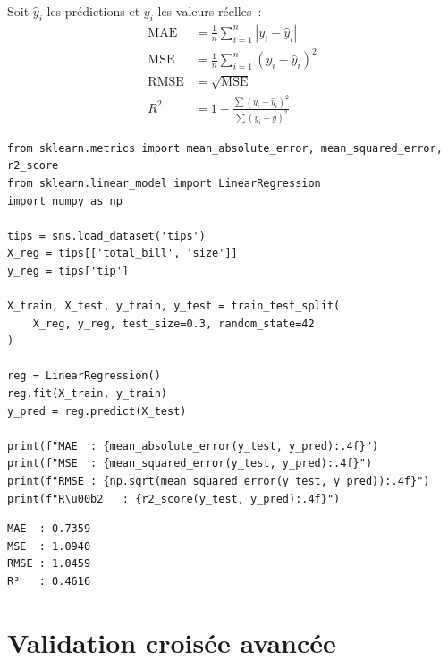 
\begin{definition}
Soit $\hat{y}_i$ les pr\'edictions et $y_i$ les valeurs r\'eelles~:
\begin{align}
\text{MAE} &= \frac{1}{n}\sum_{i=1}^{n}|y_i - \hat{y}_i| \\[6pt]
\text{MSE} &= \frac{1}{n}\sum_{i=1}^{n}(y_i - \hat{y}_i)^2 \\[6pt]
\text{RMSE} &= \sqrt{\text{MSE}} \\[6pt]
R^2 &= 1 - \frac{\sum(y_i - \hat{y}_i)^2}{\sum(y_i - \bar{y})^2}
\end{align}
\end{definition}

\begin{codeblock}[title=\textbf{Python}]
\begin{verbatim}
from sklearn.metrics import mean_absolute_error, mean_squared_error, r2_score
from sklearn.linear_model import LinearRegression
import numpy as np

tips = sns.load_dataset('tips')
X_reg = tips[['total_bill', 'size']]
y_reg = tips['tip']

X_train, X_test, y_train, y_test = train_test_split(
    X_reg, y_reg, test_size=0.3, random_state=42
)

reg = LinearRegression()
reg.fit(X_train, y_train)
y_pred = reg.predict(X_test)

print(f"MAE  : {mean_absolute_error(y_test, y_pred):.4f}")
print(f"MSE  : {mean_squared_error(y_test, y_pred):.4f}")
print(f"RMSE : {np.sqrt(mean_squared_error(y_test, y_pred)):.4f}")
print(f"R\u00b2   : {r2_score(y_test, y_pred):.4f}")
\end{verbatim}
\end{codeblock}

\begin{codeoutput}
\begin{verbatim}
MAE  : 0.7359
MSE  : 1.0940
RMSE : 1.0459
R²   : 0.4616
\end{verbatim}
\end{codeoutput}

\section{Validation crois\'ee avanc\'ee}
\label{sec:cv_avancee}



